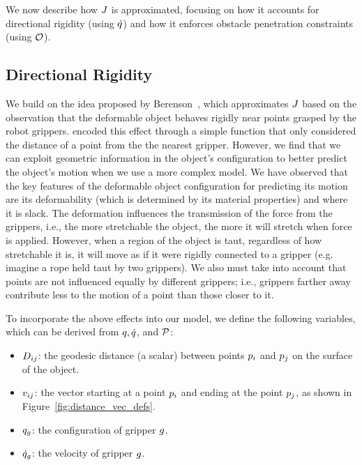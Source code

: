 We now describe how $J$ is approximated, focusing on how it accounts for directional rigidity (using $\dot{q}$) and how it enforces obstacle penetration constraints (using $\mathcal{O}$).

\subsection{Directional Rigidity}

We build on the idea proposed by Berenson~\cite{Berenson2013}, which approximates $J$ based on the observation that the deformable object behaves rigidly near points grasped by the robot grippers. \cite{Berenson2013} encoded this effect through a simple function that only considered the distance of a point from the the nearest gripper. However, we find that we can exploit geometric information in the object's configuration to better predict the object's motion when we use a more complex model. We have observed that the key features of the deformable object configuration for predicting its motion are its deformability (which is determined by its material properties) and where it is slack. The deformation influences the transmission of the force from the grippers, i.e., the more stretchable the object, the more it will stretch when force is applied. However, when a region of the object is taut, regardless of how stretchable it is, it will move as if it were rigidly connected to a gripper (e.g. imagine a rope held taut by two grippers). We also must take into account that points are not influenced equally by different grippers; i.e., grippers farther away contribute less to the motion of a point than those closer to it.

To incorporate the above effects into our model, we define the following variables, which can be derived from $q, \dot{q}$, and $\mathcal{P}$:
\begin{itemize}
    \item $D_{i j}$: the geodesic distance (a scalar) between points $p_i$ and $p_j$ on the surface of the object.
    \item $v_{i j}$: the vector starting at a point $p_i$ and ending at the point $p_j$, as shown in Figure~\ref{fig:distance_vec_defs}.
    \item $q_g$: the configuration of gripper $g$.
    \item $\dot{q}_g$: the velocity of gripper $g$.
\end{itemize}

